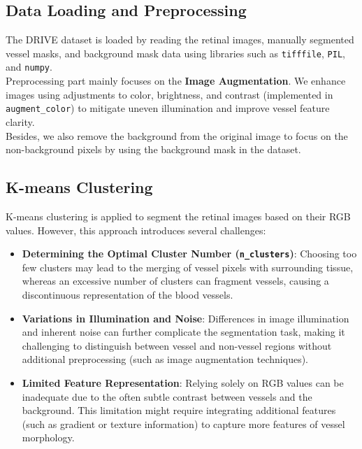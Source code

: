 \documentclass[12pt,letterpaper]{article}
\begin{document}
\subsection{Data Loading and Preprocessing}
The DRIVE dataset is loaded by reading the retinal images, manually segmented vessel masks, and background mask data using libraries such as \texttt{tifffile}, \texttt{PIL}, and \texttt{numpy}. \\
Preprocessing part mainly focuses on the \textbf{Image Augmentation}. We enhance images using adjustments to color, brightness, and contrast (implemented in \texttt{augment\_color}) to mitigate uneven illumination and improve vessel feature clarity. \\
Besides, we also remove the background from the original image to focus on the non-background pixels by using the background mask in the dataset. 
\subsection{K-means Clustering}
K-means clustering is applied to segment the retinal images based on their RGB values. However, this approach introduces several challenges:
\begin{itemize}
    \item \textbf{Determining the Optimal Cluster Number (\texttt{n\_clusters})}: Choosing too few clusters may lead to the merging of vessel pixels with surrounding tissue, whereas an excessive number of clusters can fragment vessels, causing a discontinuous representation of the blood vessels.
    \item \textbf{Variations in Illumination and Noise}: Differences in image illumination and inherent noise can further complicate the segmentation task, making it challenging to distinguish between vessel and non-vessel regions without additional preprocessing (such as image augmentation techniques).
    \item \textbf{Limited Feature Representation}: Relying solely on RGB values can be inadequate due to the often subtle contrast between vessels and the background. This limitation might require integrating additional features (such as gradient or texture information) to capture more features of vessel morphology.
\end{itemize}
\end{document}
